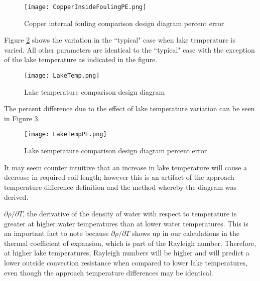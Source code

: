 	\begin{figure}
		\centering
		\texttt{[image: CopperInsideFoulingPE.png]}
		\caption{Copper internal fouling comparison design diagram percent error}
		\label{fig:DesignTools:SpcCooling:CopperInsideFoulingPE}
	\end{figure}

Figure \ref{fig:DesignTools:SpcCooling:LakeTemp} shows the variation in the ``typical" case when lake temperature is varied. All other parameters are identical to the ``typical" case with the exception of the lake temperature as indicated in the figure.

	\begin{figure}
		\centering
		\texttt{[image: LakeTemp.png]}
		\caption{Lake temperature comparison design diagram}
		\label{fig:DesignTools:SpcCooling:LakeTemp}
	\end{figure}
	
The percent difference due to the effect of lake temperature variation can be seen in Figure \ref{fig:DesignTools:SpcCooling:LakeTempPE}.

	\begin{figure}
		\centering
		\texttt{[image: LakeTempPE.png]}
		\caption{Lake temperature comparison design diagram percent error}
		\label{fig:DesignTools:SpcCooling:LakeTempPE}
	\end{figure}
	
It may seem counter intuitive that an increase in lake temperature will cause a decrease in required coil length; however this is an artifact of the approach temperature difference definition and the method whereby the diagram was derived.

$\partial \rho / \partial T$, the derivative of the density of water with respect to temperature is greater at higher water temperatures than at lower water temperatures. This is an important fact to note because $\partial \rho / \partial T$ shows up in our calculations in the thermal coefficient of expansion, which is part of the Rayleigh number. Therefore, at higher lake temperatures, Rayleigh numbers will be higher and will predict a lower outside convection resistance when compared to lower lake temperatures, even though the approach temperature differences may be identical.


